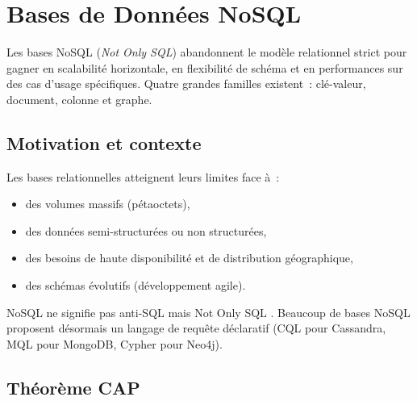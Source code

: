 \chapter{Bases de Donn\'ees NoSQL}
\label{ch:nosql}

\begin{intuition}[title=\textbf{Id\'ee centrale}]
Les bases NoSQL (\emph{Not Only SQL}) abandonnent le mod\`ele relationnel
strict pour gagner en scalabilit\'e horizontale, en flexibilit\'e de
sch\'ema et en performances sur des cas d'usage sp\'ecifiques. Quatre
grandes familles existent~: cl\'e-valeur, document, colonne et graphe.
\end{intuition}

\section{Motivation et contexte}

Les bases relationnelles atteignent leurs limites face \`a~:
\begin{itemize}
  \item des volumes massifs (p\'etaoctets),
  \item des donn\'ees semi-structur\'ees ou non structur\'ees,
  \item des besoins de haute disponibilit\'e et de distribution g\'eographique,
  \item des sch\'emas \'evolutifs (d\'eveloppement agile).
\end{itemize}

\begin{remarque}
NoSQL ne signifie pas \og anti-SQL \fg mais \og Not Only SQL \fg.
Beaucoup de bases NoSQL proposent d\'esormais un langage de requ\^ete
d\'eclaratif (CQL pour Cassandra, MQL pour MongoDB, Cypher pour Neo4j).
\end{remarque}

\section{Th\'eor\`eme CAP}

